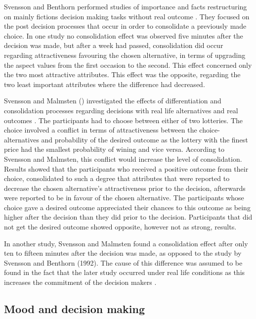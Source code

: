 \documentclass[jou,draftfirst,11pt]{apa6}
\begin{document}
Svensson and Benthorn performed studies of importance and facts
restructuring on mainly fictions decision making tasks without real
outcome \parencite{svensson92a}.  They focused on the post
decision processes that occur in order to consolidate a previously
made choice.  In one study \parencite{svensson92a} no
consolidation effect was observed five minutes after the decision was
made, but after a week had passed, consolidation did occur regarding
attractiveness favouring the chosen alternative,  in terms of
upgrading the aspect values from the first occasion to the second.
This effect concerned only the two most attractive attributes.  This
effect was the opposite, regarding the two least important attributes
where the difference had decreased.

Svensson and Malmsten (\citeyear{SvenssonMalmsten95}) investigated the
effects of differentiation and consolidation processes regarding
decisions with real life alternatives and real outcomes
\parencite{SvenssonMalmsten95}. The participants had to choose between
either of two lotteries. The choice involved a conflict in terms of
attractiveness between the choice-alternatives and probability of the
desired outcome as the lottery with the finest price had the smallest
probability of wining and vice versa.  According to Svensson and
Malmsten, this conflict would increase the level of consolidation.
Results showed that the participants who received a positive outcome
from their choice, consolidated to such a degree that attributes that
were reported to decrease the chosen alternative's attractiveness
prior to the decision, afterwards were reported to be in favour of the
chosen alternative.  The participants whose choice gave a desired
outcome appreciated their chances to this outcome as being higher
after the decision than they did prior to the decision.  Participants
that did not get the desired outcome showed opposite, however not as
strong, results.

In another study, Svensson and Malmsten found a consolidation effect
after only ten to fifteen minutes after the decision was made, as
opposed to the study by Svensson and Benthorn (1992).  The cause of
this difference was assumed to be found in the fact that the later
study occurred under real life conditions as this increases the
commitment of the decision makers \parencite{SvenssonMalmsten95}.


\subsection{Mood and decision making}
\end{document}
